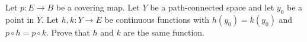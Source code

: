 \begin{problem}
  Let \(p\colon E\to B\) be a covering map. Let \(Y\) be a path-connected
  space and let \(y_0\) be a point in \(Y\). Let \(h,k\colon Y\to E\) be
  continuous functions with \(h(y_0)=k(y_0)\) and \(p\circ h=p\circ
  k\). Prove that \(h\) and \(k\) are the same function.
\end{problem}
\begin{solution}
\end{solution}

